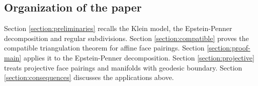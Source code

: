 \documentclass[oneside,a4paper,12pt]{article}
\theoremstyle{plain}
\theoremstyle{definition}
\theoremstyle{remark}
\numberwithin{equation}{section}
\begin{document}

\subsection*{Organization of the paper}
Section \ref{section:preliminaries} recalls the Klein model, the Epstein-Penner decomposition and regular subdivisions. Section \ref{section:compatible} proves the compatible triangulation theorem for affine face pairings. Section \ref{section:proof-main} applies it to the Epstein-Penner decomposition. Section \ref{section:projective} treats projective face pairings and manifolds with geodesic boundary. Section \ref{section:consequences} discusses the applications above.
\end{document}
